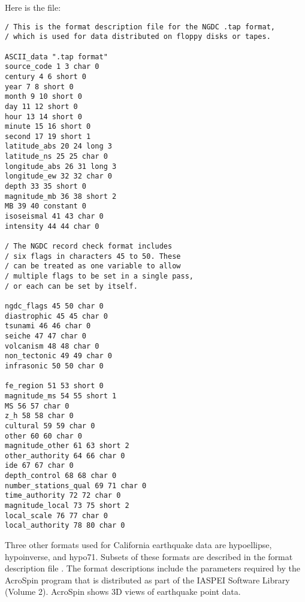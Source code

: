 Here is the  file:
\nopagebreak
\T\bgroup
\T\footnotesize
\begin{verbatim}
/ This is the format description file for the NGDC .tap format, 
/ which is used for data distributed on floppy disks or tapes.

ASCII_data ".tap format"
source_code 1 3 char 0
century 4 6 short 0
year 7 8 short 0
month 9 10 short 0
day 11 12 short 0
hour 13 14 short 0
minute 15 16 short 0
second 17 19 short 1
latitude_abs 20 24 long 3
latitude_ns 25 25 char 0
longitude_abs 26 31 long 3
longitude_ew 32 32 char 0
depth 33 35 short 0
magnitude_mb 36 38 short 2
MB 39 40 constant 0
isoseismal 41 43 char 0
intensity 44 44 char 0

/ The NGDC record check format includes
/ six flags in characters 45 to 50. These
/ can be treated as one variable to allow
/ multiple flags to be set in a single pass,
/ or each can be set by itself.

ngdc_flags 45 50 char 0
diastrophic 45 45 char 0
tsunami 46 46 char 0
seiche 47 47 char 0
volcanism 48 48 char 0
non_tectonic 49 49 char 0
infrasonic 50 50 char 0

fe_region 51 53 short 0
magnitude_ms 54 55 short 1
MS 56 57 char 0
z_h 58 58 char 0
cultural 59 59 char 0
other 60 60 char 0
magnitude_other 61 63 short 2
other_authority 64 66 char 0
ide 67 67 char 0
depth_control 68 68 char 0
number_stations_qual 69 71 char 0
time_authority 72 72 char 0
magnitude_local 73 75 short 2
local_scale 76 77 char 0
local_authority 78 80 char 0 
\end{verbatim}
\T\egroup

Three other formats used for California earthquake data are
hypoellipse, hypoinverse, and hypo71. Subsets of these formats are
described in the format description file . The format
descriptions include the parameters required by the AcroSpin program
that is distributed as part of the IASPEI Software Library (Volume 2).
AcroSpin shows 3D views of earthquake point data.

